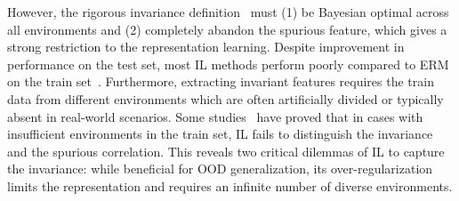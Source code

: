 However, the rigorous invariance definition~\citep{irmv1} must (1) be Bayesian optimal across all environments and (2) completely abandon the spurious feature, which gives a strong restriction to the representation learning.
Despite improvement in performance on the test set, most IL methods perform poorly compared to ERM on the train set~\citep{eiil,irm_aistats,v-rex}.
Furthermore, extracting invariant features requires the train data from different environments which are often artificially divided or typically absent in real-world scenarios.
Some studies~\citep{zin,kamath2021does} have proved that in cases with insufficient environments in the train set, IL fails to distinguish the invariance and the spurious correlation.
This reveals two critical dilemmas of IL to capture the invariance: while beneficial for OOD generalization, its over-regularization limits the representation and requires an infinite number of diverse environments.

